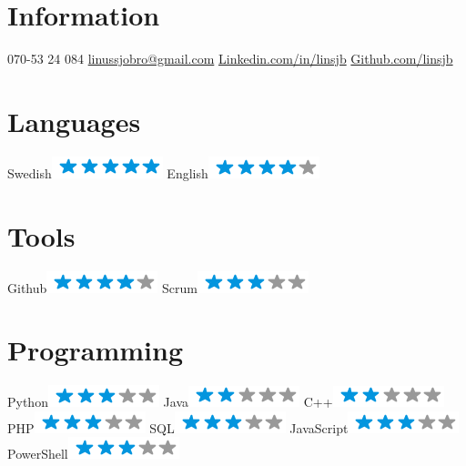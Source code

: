 \begin{aside}
    \section{Information}
      070-53 24 084
      \href{mailto:linussjobro@gmail.com}{linussjobro@gmail.com}
      \href{https://www.linkedin.com/in/linsjb}{Linkedin.com/in/linsjb}
      \href{https://github.com/linsjb}{Github.com/linsjb}
    \section{Languages}
      Swedish\includegraphics[scale=0.40]{img/5stars.png}
      English\includegraphics[scale=0.40]{img/4stars.png}
    \section{Tools}
      Github\includegraphics[scale=0.40]{img/4stars.png}
      Scrum\includegraphics[scale=0.40]{img/3stars.png}
    \section{Programming}
      Python\includegraphics[scale=0.40]{img/3stars.png}
      Java\includegraphics[scale=0.40]{img/2stars.png}
      C++\includegraphics[scale=0.40]{img/2stars.png}
      PHP\includegraphics[scale=0.40]{img/3stars.png}
      SQL\includegraphics[scale=0.40]{img/3stars.png}
      JavaScript\includegraphics[scale=0.40]{img/3stars.png}
      PowerShell\includegraphics[scale=0.40]{img/3stars.png}

\end{aside}

